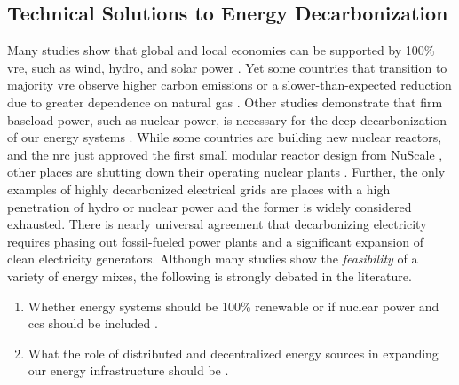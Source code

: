 \subsection{Technical Solutions to Energy Decarbonization}

Many studies show that global and local economies can be supported by 100\%
\ac{vre}, such as wind, hydro, and solar power \cite{jacobson_100_2015,
bussar_optimal_2014,brown_response_2018,dorotic_integration_2019,wallsgrove_emerging_2021,
cochran_la100_2021,cosic_100_2012,traber_economically_2021,bogdanov_full_2021,
bogdanov_north-east_2016,
esteban_100_2018,yue_least_2020,neumann_near-optimal_2021}. Yet some countries
that transition to majority \ac{vre} observe higher carbon emissions or a
slower-than-expected reduction due to greater dependence on natural gas
\cite{wagner_co2_2021}. Other studies demonstrate that firm baseload power, such as nuclear power, is
necessary for the deep decarbonization of our energy systems
\cite{wagner_co2_2021,shaner_geophysical_2018,dotson_influence_2022,greene_enhancing_2019,kim_carbon_2021,lehtveer_how_2015,vaillancourt_role_2008,
de_sisternes_value_2016,alzbutas_uncertainty_2012,brook_why_2014,
epiney_economic_2020,petti_future_2018, patrizio_socially_2020}. While some
countries are building new nuclear reactors, and the \ac{nrc} just approved the
first small modular reactor design from NuScale
\cite{office_of_nuclear_energy_science_and_technology_nrc_2023}, other places
are shutting down their operating nuclear plants \cite{johnson_new_2021}. 
Further,
the only examples of highly decarbonized electrical grids are places with a high
penetration of hydro or nuclear power and the former is widely considered
exhausted. There is nearly universal agreement that decarbonizing electricity
requires phasing out fossil-fueled power plants and a significant expansion of
clean electricity generators. Although many studies show the
\textit{feasibility} of a variety of energy mixes, the following is strongly
debated in the literature.
\begin{enumerate}
    \item Whether energy systems should be 100\% renewable or if nuclear power and
    \ac{ccs} should be included \cite{heard_burden_2017,
    brown_response_2018,elmallah_frontlining_2022, brook_why_2014}.
    \item What the role of distributed and decentralized energy sources in
    expanding our energy infrastructure should be
    \cite{pitt_assessing_2015,rinaldi_what_2022,parag_electricity_2016,wang_modeling_2020,
    morvaj_decarbonizing_2017,gilbert_can_2020,li_economic_2016,falke_multi-objective_2016}.
\end{enumerate}
